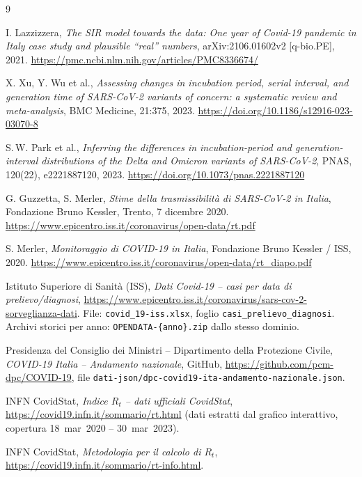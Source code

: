 \documentclass[12pt, a4paper]{article}
\begin{document}
\begin{thebibliography}{9}

I. Lazzizzera,
\textit{The SIR model towards the data: One year of Covid-19 pandemic in Italy case study
and plausible ``real'' numbers},
arXiv:2106.01602v2 [q-bio.PE], 2021.
\url{https://pmc.ncbi.nlm.nih.gov/articles/PMC8336674/}

X. Xu, Y. Wu et al.,
\textit{Assessing changes in incubation period, serial interval, and generation time of
SARS-CoV-2 variants of concern: a systematic review and meta-analysis},
BMC Medicine, 21:375, 2023.
\url{https://doi.org/10.1186/s12916-023-03070-8}

S.\,W. Park et al.,
\textit{Inferring the differences in incubation-period and generation-interval distributions
of the Delta and Omicron variants of SARS-CoV-2},
PNAS, 120(22), e2221887120, 2023.
\url{https://doi.org/10.1073/pnas.2221887120}

G. Guzzetta, S. Merler,
\textit{Stime della trasmissibilità di SARS-CoV-2 in Italia},
Fondazione Bruno Kessler, Trento, 7 dicembre 2020.
\url{https://www.epicentro.iss.it/coronavirus/open-data/rt.pdf}

S. Merler,
\textit{Monitoraggio di COVID-19 in Italia},
Fondazione Bruno Kessler / ISS, 2020.
\url{https://www.epicentro.iss.it/coronavirus/open-data/rt_diapo.pdf}


Istituto Superiore di Sanità (ISS),
\textit{Dati Covid-19 -- casi per data di prelievo/diagnosi},
\url{https://www.epicentro.iss.it/coronavirus/sars-cov-2-sorveglianza-dati}.
File: \texttt{covid\_19-iss.xlsx}, foglio \texttt{casi\_prelievo\_diagnosi}.
Archivi storici per anno: \texttt{OPENDATA-\{anno\}.zip} dallo stesso dominio.

Presidenza del Consiglio dei Ministri -- Dipartimento della Protezione Civile,
\textit{COVID-19 Italia -- Andamento nazionale},
GitHub, \url{https://github.com/pcm-dpc/COVID-19},
file \texttt{dati-json/dpc-covid19-ita-andamento-nazionale.json}.

INFN CovidStat,
\textit{Indice $R_t$ -- dati ufficiali CovidStat},
\url{https://covid19.infn.it/sommario/rt.html}
(dati estratti dal grafico interattivo, copertura 18~mar~2020 -- 30~mar~2023).

INFN CovidStat,
\textit{Metodologia per il calcolo di $R_t$},
\url{https://covid19.infn.it/sommario/rt-info.html}.


\end{thebibliography}
\end{document}
